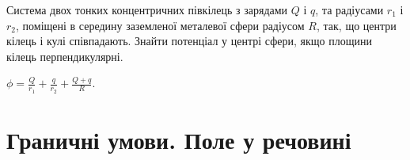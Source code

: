 \begin{problem}
Система двох тонких концентричних півкілець з зарядами $Q$ і $q$, та радіусами $r_1$ і $r_2$, поміщені в середину заземленої металевої сфери радіусом $R$, так, що центри кілець і кулі співпадають. Знайти потенціал у центрі сфери, якщо площини кілець перпендикулярні.
\begin{solution}
	$\phi = \frac{Q}{r_1} + \frac{q}{r_2} + \frac{Q+q}{R}$.
\end{solution}
\end{problem}


\section{Граничні умови. Поле у речовині}

